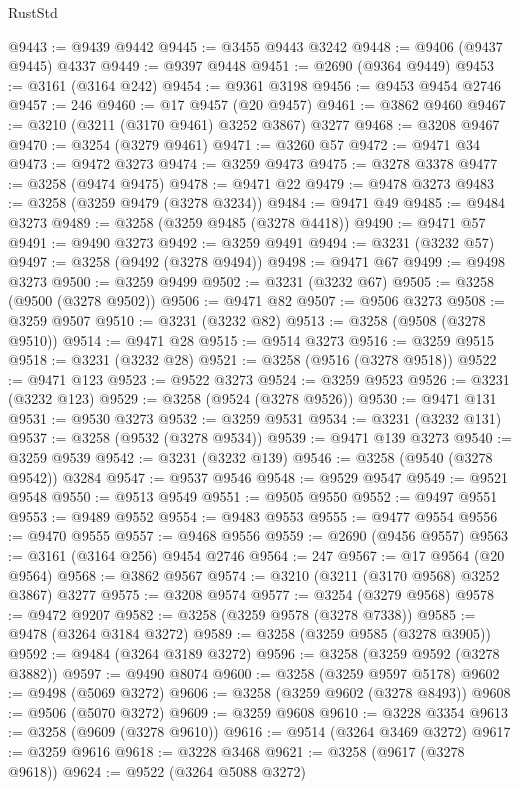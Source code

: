 \begin{lexlean}{RustStd}
\begin{coremodule}
@9443 := @9439 @9442
@9445 := @3455 @9443 @3242
@9448 := @9406 (@9437 @9445) @4337
@9449 := @9397 @9448
@9451 := @2690 (@9364 @9449)
@9453 := @3161 (@3164 @242)
@9454 := @9361 @3198
@9456 := @9453 @9454 @2746
@9457 := 246
@9460 := @17 @9457 (@20 @9457)
@9461 := @3862 @9460
@9467 := @3210 (@3211 (@3170 @9461) @3252 @3867) @3277
@9468 := @3208 @9467
@9470 := @3254 (@3279 @9461)
@9471 := @3260 @57
@9472 := @9471 @34
@9473 := @9472 @3273
@9474 := @3259 @9473
@9475 := @3278 @3378
@9477 := @3258 (@9474 @9475)
@9478 := @9471 @22
@9479 := @9478 @3273
@9483 := @3258 (@3259 @9479 (@3278 @3234))
@9484 := @9471 @49
@9485 := @9484 @3273
@9489 := @3258 (@3259 @9485 (@3278 @4418))
@9490 := @9471 @57
@9491 := @9490 @3273
@9492 := @3259 @9491
@9494 := @3231 (@3232 @57)
@9497 := @3258 (@9492 (@3278 @9494))
@9498 := @9471 @67
@9499 := @9498 @3273
@9500 := @3259 @9499
@9502 := @3231 (@3232 @67)
@9505 := @3258 (@9500 (@3278 @9502))
@9506 := @9471 @82
@9507 := @9506 @3273
@9508 := @3259 @9507
@9510 := @3231 (@3232 @82)
@9513 := @3258 (@9508 (@3278 @9510))
@9514 := @9471 @28
@9515 := @9514 @3273
@9516 := @3259 @9515
@9518 := @3231 (@3232 @28)
@9521 := @3258 (@9516 (@3278 @9518))
@9522 := @9471 @123
@9523 := @9522 @3273
@9524 := @3259 @9523
@9526 := @3231 (@3232 @123)
@9529 := @3258 (@9524 (@3278 @9526))
@9530 := @9471 @131
@9531 := @9530 @3273
@9532 := @3259 @9531
@9534 := @3231 (@3232 @131)
@9537 := @3258 (@9532 (@3278 @9534))
@9539 := @9471 @139 @3273
@9540 := @3259 @9539
@9542 := @3231 (@3232 @139)
@9546 := @3258 (@9540 (@3278 @9542)) @3284
@9547 := @9537 @9546
@9548 := @9529 @9547
@9549 := @9521 @9548
@9550 := @9513 @9549
@9551 := @9505 @9550
@9552 := @9497 @9551
@9553 := @9489 @9552
@9554 := @9483 @9553
@9555 := @9477 @9554
@9556 := @9470 @9555
@9557 := @9468 @9556
@9559 := @2690 (@9456 @9557)
@9563 := @3161 (@3164 @256) @9454 @2746
@9564 := 247
@9567 := @17 @9564 (@20 @9564)
@9568 := @3862 @9567
@9574 := @3210 (@3211 (@3170 @9568) @3252 @3867) @3277
@9575 := @3208 @9574
@9577 := @3254 (@3279 @9568)
@9578 := @9472 @9207
@9582 := @3258 (@3259 @9578 (@3278 @7338))
@9585 := @9478 (@3264 @3184 @3272)
@9589 := @3258 (@3259 @9585 (@3278 @3905))
@9592 := @9484 (@3264 @3189 @3272)
@9596 := @3258 (@3259 @9592 (@3278 @3882))
@9597 := @9490 @8074
@9600 := @3258 (@3259 @9597 @5178)
@9602 := @9498 (@5069 @3272)
@9606 := @3258 (@3259 @9602 (@3278 @8493))
@9608 := @9506 (@5070 @3272)
@9609 := @3259 @9608
@9610 := @3228 @3354
@9613 := @3258 (@9609 (@3278 @9610))
@9616 := @9514 (@3264 @3469 @3272)
@9617 := @3259 @9616
@9618 := @3228 @3468
@9621 := @3258 (@9617 (@3278 @9618))
@9624 := @9522 (@3264 @5088 @3272)

\end{coremodule}
\end{lexlean}
